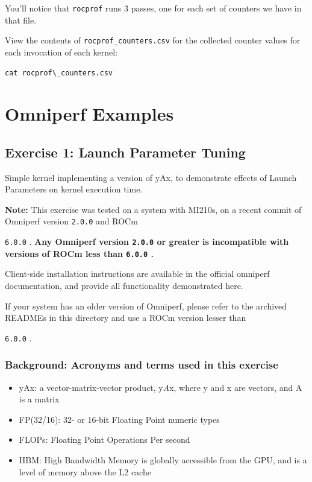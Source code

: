 \documentclass[
]{article}
\let\oldtexttt\texttt
\renewcommand{\texttt}[1]{
  \colorbox{Light}{\oldtexttt{#1}}
}
\begin{document}
You'll notice that \texttt{rocprof} runs 3 passes, one for each set of
counters we have in that file.

View the contents of \texttt{rocprof\_counters.csv} for the collected
counter values for each invocation of each kernel:

\begin{verbatim}
cat rocprof\_counters.csv
\end{verbatim}


\hypertarget{omniperf-examples}{%
\section{Omniperf Examples}\label{omniperf-examples}}

\hypertarget{exercise-1-launch-parameter-tuning}{%
\subsection{Exercise 1: Launch Parameter
Tuning}\label{exercise-1-launch-parameter-tuning}}

Simple kernel implementing a version of yAx, to demonstrate effects of
Launch Parameters on kernel execution time.

\textbf{Note:} This exercise was tested on a system with MI210s, on a
recent commit of Omniperf version \texttt{2.0.0} and ROCm
\texttt{6.0.0}. \textbf{Any Omniperf version \texttt{2.0.0} or greater
is incompatible with versions of ROCm less than \texttt{6.0.0}.}

Client-side installation instructions are available in the official
omniperf documentation, and provide all functionality demonstrated here.

If your system has an older version of Omniperf, please refer to the
archived READMEs in this directory and use a ROCm version lesser than
\texttt{6.0.0}.

\subsubsection*{Background: Acronyms and terms used in this exercise}

\begin{itemize}
     
\item yAx: a vector-matrix-vector product, y\emph{A}x, where y and x are
vectors, and A is a matrix

\item FP(32/16): 32- or 16-bit Floating Point numeric types

\item FLOPs: Floating Point Operations Per second

\item HBM: High Bandwidth Memory is globally accessible from the GPU, and is a
level of memory above the L2 cache

\end{itemize}
\end{document}
